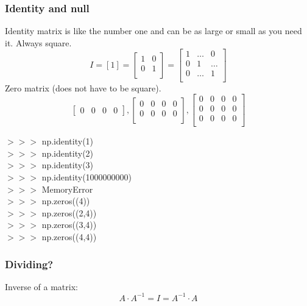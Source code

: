 \documentclass{beamer}
\begin{document}
\begin{frame}
\frametitle{Identity and null}
Identity matrix is like the number one and can be as large or small as you need it. Always square. 
\[I=[1]=
\begin{bmatrix}
1 & 0 \\
0 & 1\\
\end{bmatrix}
=
\begin{bmatrix}
 1 & \dots & 0\\
0 & 1 & \dots\\
0 & \dots & 1\\
\end{bmatrix}
\]
Zero matrix (does not have to be square).
\[
\begin{bmatrix}
0 & 0 & 0 & 0
\end{bmatrix},
\begin{bmatrix}
0 & 0 & 0 & 0\\
0 & 0 & 0 & 0\\
\end{bmatrix},
\begin{bmatrix}
0 & 0 & 0 & 0\\
0 & 0 & 0 & 0\\
0 & 0 & 0 & 0\\
\end{bmatrix}
\]
\end{frame}
\begin{example}[code]
$>>>$ np.identity(1)\\
$>>>$ np.identity(2)\\
$>>>$ np.identity(3)\\
$>>>$ np.identity(1000000000)\\
$>>>$ MemoryError
$$$$
$>>>$ np.zeros((4))\\
$>>>$ np.zeros((2,4))\\
$>>>$ np.zeros((3,4))\\
$>>>$ np.zeros((4,4))\\


\end{example}
\begin{frame}
\frametitle{Dividing?}
Inverse of a matrix:
$$A\cdot A^{-1}=I=A^{-1}\cdot A$$
\end{frame}
\end{document}
